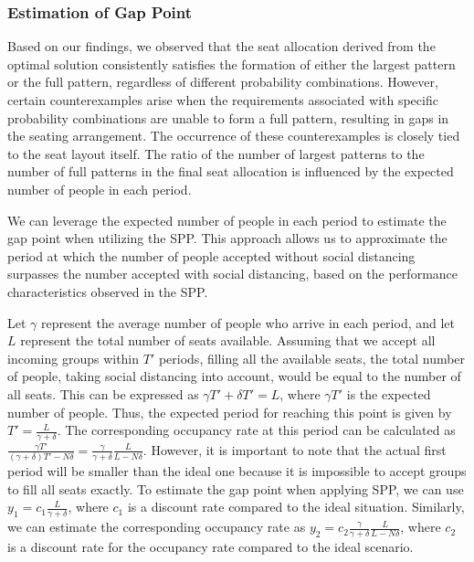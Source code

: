 \subsubsection{Estimation of Gap Point}
Based on our findings, we observed that the seat allocation derived from the optimal solution consistently satisfies the formation of either the largest pattern or the full pattern, regardless of different probability combinations. However, certain counterexamples arise when the requirements associated with specific probability combinations are unable to form a full pattern, resulting in gaps in the seating arrangement. The occurrence of these counterexamples is closely tied to the seat layout itself. The ratio of the number of largest patterns to the number of full patterns in the final seat allocation is influenced by the expected number of people in each period.

We can leverage the expected number of people in each period to estimate the gap point when utilizing the SPP. This approach allows us to approximate the period at which the number of people accepted without social distancing surpasses the number accepted with social distancing, based on the performance characteristics observed in the SPP.


Let $\gamma$ represent the average number of people who arrive in each period, and let $L$ represent the total number of seats available. Assuming that we accept all incoming groups within $T'$ periods, filling all the available seats, the total number of people, taking social distancing into account, would be equal to the number of all seats. This can be expressed as $\gamma T' + \delta T' = L$, where $\gamma T'$ is the expected number of people. Thus, the expected period for reaching this point is given by $T' = \frac{L}{\gamma + \delta}$. The corresponding occupancy rate at this period can be calculated as $\frac{\gamma T'}{(\gamma+ \delta)T' - N \delta} = \frac{\gamma}{\gamma +\delta} \frac{L}{L-N \delta}$. However, it is important to note that the actual first period will be smaller than the ideal one because it is impossible to accept groups to fill all seats exactly. To estimate the gap point when applying SPP, we can use $y_1 = c_1 \frac{L}{\gamma + \delta}$, where $c_1$ is a discount rate compared to the ideal situation. Similarly, we can estimate the corresponding occupancy rate as $y_2 = c_2 \frac{\gamma}{\gamma +\delta} \frac{L}{L-N \delta}$, where $c_2$ is a discount rate for the occupancy rate compared to the ideal scenario.

